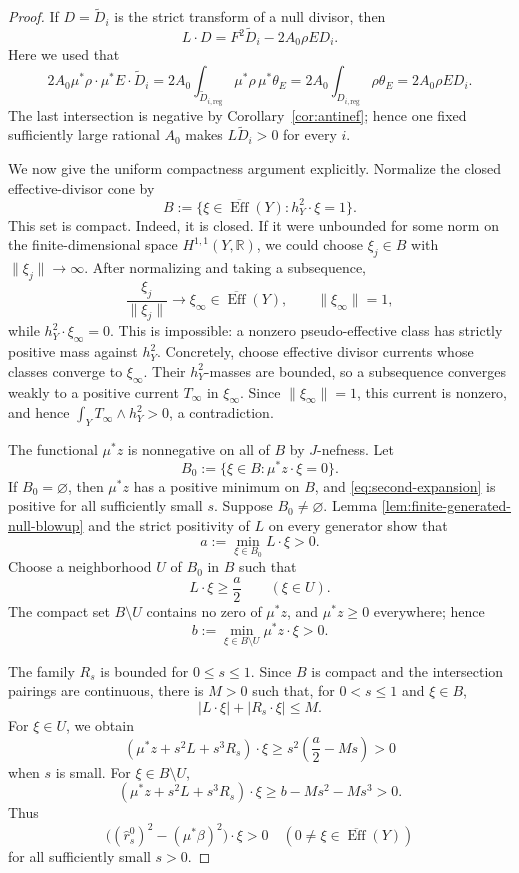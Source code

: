 \documentclass[reqno]{amsart}
\theoremstyle{remark}
\newcommand{\reg}{\text{reg}}
\theoremstyle{plain}
\begin{document}
\begin{proof}
If $D=\widetilde D_i$ is the strict
transform of a null divisor, then
\[
 L\cdot D=F^2\widetilde D_i-2A_0\rho ED_i.
\]
Here we used that \[
2A_0\mu^*\rho \cdot \mu^*E\cdot \widetilde{D}_i=2A_0\int_{\widetilde{D}_{i,\reg}}\mu^*\rho\, \mu^*\theta_E=2A_0\int_{D_{i,\reg}}\rho\theta_E=2A_0\rho ED_i.
\]
The last intersection is negative by
Corollary~\ref{cor:antinef}; hence one fixed sufficiently
large rational $A_0$ makes $L\widetilde D_i>0$ for every $i$.



We now give the uniform compactness argument explicitly.  Normalize the
closed effective-divisor cone by
\[
 B:=\{\xi\in\overline{\operatorname{Eff}}(Y):
                  h_Y^2\cdot\xi=1\}.
\]
This set is compact.  Indeed, it is closed.  If it were unbounded for
some norm on the finite-dimensional space $H^{1,1}(Y,\mathbb R)$,
we could choose $\xi_j\in B$ with $\|\xi_j\|\to\infty$.  After
normalizing and taking a subsequence,
\[
 \frac{\xi_j}{\|\xi_j\|}\longrightarrow\xi_\infty
 \in\overline{\operatorname{Eff}}(Y),\qquad
 \|\xi_\infty\|=1,
\]
while $h_Y^2\cdot\xi_\infty=0$.  This is impossible: a nonzero
pseudo-effective class has strictly positive mass against
$h_Y^2$.  Concretely, choose effective divisor currents whose classes
converge to $\xi_\infty$.  Their $h_Y^2$-masses are bounded, so a
subsequence converges weakly to a positive current $T_\infty$ in
$\xi_\infty$.  Since $\|\xi_\infty\|=1$, this current is nonzero,
and hence
$\int_YT_\infty\wedge h_Y^2>0$, a contradiction.

The functional $\mu^*z$ is nonnegative on all of $B$ by $J$-nefness.  Let
\[
 B_0:=\{\xi\in B:\mu^*z\cdot\xi=0\}.
\]
If $B_0=\varnothing$, then $\mu^*z$ has a positive minimum on $B$,
and \eqref{eq:second-expansion} is positive for all sufficiently small
$s$.  Suppose $B_0\neq\varnothing$.  Lemma \ref{lem:finite-generated-null-blowup} and the strict positivity of $L$ on every generator show that
\[
 a:=\min_{\xi\in B_0}L\cdot\xi>0.
\]
Choose a neighborhood $U$ of $B_0$ in $B$ such that
\[
 L\cdot\xi\geq\frac a2\qquad(\xi\in U).
\]
The compact set $B\setminus U$ contains no zero of $\mu^*z$, and
$\mu^*z\geq0$ everywhere; hence
\[
 b:=\min_{\xi\in B\setminus U}\mu^*z\cdot\xi>0.
\]

The family $R_s$ is bounded for $0\leq s\leq1$.  Since $B$ is
compact and the intersection pairings are continuous, there is
$M>0$ such that, for $0<s\leq1$ and $\xi\in B$,
\[
 |L\cdot\xi|+|R_s\cdot\xi|\leq M.
\]
For $\xi\in U$, we obtain
\[
 (\mu^*z+s^2L+s^3R_s)\cdot\xi
 \geq s^2\left(\frac a2-Ms\right)>0
\]
when $s$ is small.  For $\xi\in B\setminus U$,
\[
 (\mu^*z+s^2L+s^3R_s)\cdot\xi
 \geq b-Ms^2-Ms^3>0.
\]
Thus
\[
 \bigl((\widehat r_s^0)^2-(\mu^*\beta)^2\bigr)\cdot\xi>0
 \quad
 (0\neq\xi\in\overline{\operatorname{Eff}}(Y))
\]
for all sufficiently small $s>0$.


\end{proof}
\end{document}
